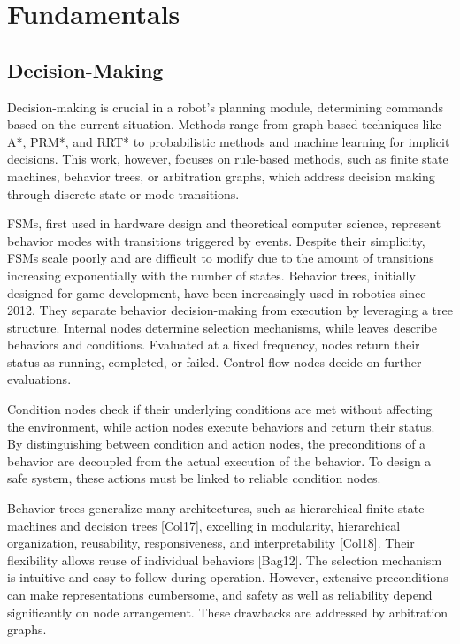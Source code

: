 
\section{Fundamentals}


\subsection{Decision-Making}

Decision-making is crucial in a robot's planning module, determining commands based on the current situation.
Methods range from graph-based techniques like A*, PRM*, and RRT* to probabilistic methods and machine learning for implicit decisions.
This work, however, focuses on rule-based methods, such as finite state machines, behavior trees, or arbitration graphs, which address decision making through discrete state or mode transitions.

FSMs, first used in hardware design and theoretical computer science, represent behavior modes with transitions triggered by events.
Despite their simplicity, FSMs scale poorly and are difficult to modify due to the amount of transitions increasing exponentially with the number of states.
Behavior trees, initially designed for game development, have been increasingly used in robotics since 2012.
They separate behavior decision-making from execution by leveraging a tree structure.
Internal nodes determine selection mechanisms, while leaves describe behaviors and conditions.
Evaluated at a fixed frequency, nodes return their status as running, completed, or failed.
Control flow nodes decide on further evaluations.

Condition nodes check if their underlying conditions are met without affecting the environment, while action nodes execute behaviors and return their status.
By distinguishing between condition and action nodes, the preconditions of a behavior  are decoupled from the actual execution of the behavior.
To design a safe system, these actions must be linked to reliable condition nodes.

Behavior trees generalize many architectures, such as hierarchical finite state machines and decision trees [Col17], excelling in modularity, hierarchical organization, reusability, responsiveness, and interpretability [Col18].
Their flexibility allows reuse of individual behaviors [Bag12].
The selection mechanism is intuitive and easy to follow during operation.
However, extensive preconditions can make representations cumbersome, and safety as well as reliability depend significantly on node arrangement.
These drawbacks are addressed by arbitration graphs.

